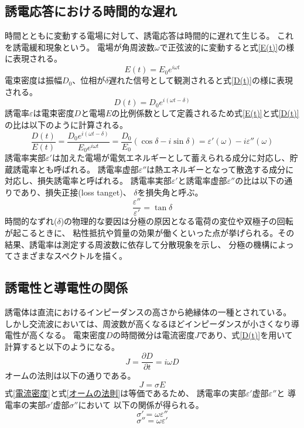 \documentclass[dvipdfmx,12pt,a4paper]{jreport}
\begin{document}
			\subsection{誘電応答における時間的な遅れ}
			時間とともに変動する電場に対して、誘電応答は時間的に遅れて生じる。
			これを誘電緩和現象という。
			電場が角周波数$\omega$で正弦波的に変動すると式\eqref{E(t)}の様に表現される。
			\begin{equation}
				E(t)=E_0 e^{i\omega t}
				\label{E(t)}
			\end{equation}
			電束密度は振幅$D_0$、位相が$\delta$遅れた信号として観測されると式\eqref{D(t)}の様に表現される。
			\begin{equation}
				D(t)=D_0 e^{i(\omega t-\delta)}
				\label{D(t)}
			\end{equation}
			誘電率$\varepsilon$は電束密度$D$と電場$E$の比例係数として定義されるため式\eqref{E(t)}と式\eqref{D(t)}
			の比は以下のように計算される。
			\begin{equation}
				\frac{D(t)}{E(t)}=\frac{D_0e^{i(\omega t-\delta)}}{E_0 e^{i\omega t}}
				=\frac{D_0}{E_0}\left(\cos\delta-i\sin\delta\right)=\varepsilon'(\omega)-i\varepsilon''(\omega)
			\end{equation}
			誘電率実部$\varepsilon'$は加えた電場が電気エネルギーとして蓄えられる成分に対応し、貯蔵誘電率とも呼ばれる。
			誘電率虚部$\varepsilon''$は熱エネルギーとなって散逸する成分に対応し、損失誘電率と呼ばれる。
			誘電率実部$\varepsilon'$と誘電率虚部$\varepsilon''$の比は以下の通りであり、損失正接(loss tanget)、
			$\delta$を損失角と呼ぶ。
			\begin{equation}
				\frac{\varepsilon''}{\varepsilon'}=\tan\delta
				\label{tandel}
			\end{equation}
			時間的なずれ($\delta$)の物理的な要因は分極の原因となる電荷の変位や双極子の回転が起こるときに、
			粘性抵抗や質量の効果が働くといった点が挙げられる。その結果、誘電率は測定する周波数に依存して分散現象を示し、
			分極の機構によってさまざまなスペクトルを描く。
			\subsection{誘電性と導電性の関係}
			誘電体は直流におけるインピーダンスの高さから絶縁体の一種とされている。
			しかし交流波においては、周波数が高くなるほどインピーダンスが小さくなり導電性が高くなる。
			電束密度$D$の時間微分は電流密度$J$であり、式\eqref{D(t)}を用いて計算すると以下のようになる。
			\begin{equation}
				J=\frac{\partial D}{\partial t}=i\omega D
				\label{電流密度}
			\end{equation}
			オームの法則は以下の通りである。
			\begin{equation}
				J=\sigma E
				\label{オームの法則}
			\end{equation}
			式\eqref{電流密度}と式\eqref{オームの法則}は等価であるため、
			誘電率の実部$\varepsilon'$虚部$\varepsilon''$と
			導電率の実部$\sigma'$虚部$\sigma''$において
			以下の関係が得られる。
			\begin{equation}
				\sigma'=\omega\varepsilon''
			\end{equation}
			\begin{equation}
				\sigma''=\omega\varepsilon'
			\end{equation}
\end{document}
